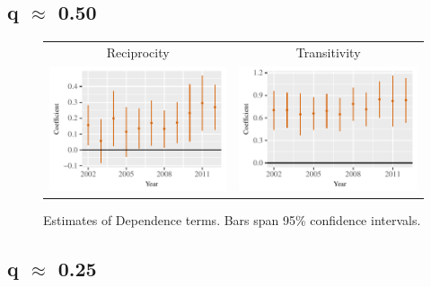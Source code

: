\documentclass[reqno,onecolumn,letterpaper,12pt]{article}
\begin{document}
{\subsection{q $\approx$ 0.50}

\begin{figure}[!h]
\centering
\begin{tabular}{c@{\hskip 0cm}c}
Reciprocity & Transitivity \\
\includegraphics[height=.2\textheight, clip=true, trim=0cm 0cm 0cm .2cm]{draft_figures/rl_amelia_q50/Mutuality.pdf}    &
\includegraphics[height=.2\textheight, clip=true, trim=0cm 0cm 0cm .2cm]{draft_figures/rl_amelia_q50/Transitivity.pdf}
\end{tabular}
\caption{\label{fig:q50_amelia_netterms} Estimates of Dependence terms. Bars span 95\% confidence intervals. }
\end{figure}

\clearpage

\subsection{q $\approx$ 0.25}

}
\end{document}
